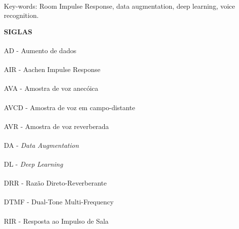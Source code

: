 \paragraph{}
\noindent Key-words: Room Impulse Response, data augmentation, deep learning, voice recognition.

\pagebreak


\begin{center}
\textbf{SIGLAS}
\end{center}
      \vspace{0.5cm}

\paragraph{}AD - Aumento de dados
\paragraph{}AIR - Aachen Impulse Response
\paragraph{}AVA - Amostra de voz anecóica
\paragraph{}AVCD - Amostra de voz em campo-distante
\paragraph{}AVR - Amostra de voz reverberada
\paragraph{}DA - \textit{Data Augmentation}
\paragraph{}DL - \textit{Deep Learning}
\paragraph{}DRR - Razão Direto-Reverberante
\paragraph{}DTMF - Dual-Tone Multi-Frequency
\paragraph{}RIR - Resposta ao Impulso de Sala
